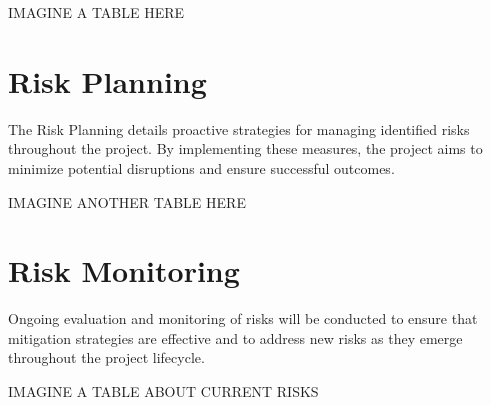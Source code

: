 \documentclass{article}
\begin{document}
IMAGINE A TABLE HERE

\section{Risk Planning}

The Risk Planning details proactive strategies for managing identified risks throughout the project. By implementing these measures, the project aims to minimize potential disruptions and ensure successful outcomes.

IMAGINE ANOTHER TABLE HERE

\section{Risk Monitoring}

Ongoing evaluation and monitoring of risks will be conducted to ensure that mitigation strategies are effective and to address new risks as they emerge throughout the project lifecycle.

IMAGINE A TABLE ABOUT CURRENT RISKS
\end{document}

